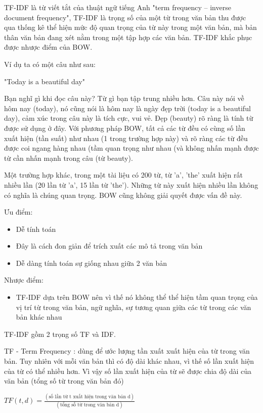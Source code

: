 TF-IDF là từ viết tắt của thuật ngữ tiếng Anh "term frequency – inverse document frequency", TF-IDF là trọng số của một từ trong văn bản thu được qua thống kê thể hiện mức độ quan trọng của từ này trong một văn bản, mà bản thân văn bản đang xét nằm trong một tập hợp các văn bản. TF-IDF khắc phục được nhược điểm của BOW.

Ví dụ ta có một câu như sau:

"Today is a beautiful day"
  
Bạn nghĩ gì khi đọc câu này? Từ gì bạn tập trung nhiều hơn. Câu này nói về hôm nay (today), nó cũng nói là hôm nay là ngày đẹp trời (today is a beautiful day), cảm xúc trong câu này là tích cực, vui vẻ. Đẹp (beauty) rõ ràng là tính từ được sử dụng ở đây. Với phương pháp BOW, tất cả các từ đều có cùng số lần xuất hiện (tần suất) như nhau (1 trong trường hợp này) và rõ ràng các từ đều được coi ngang hàng nhau (tầm quan trọng như nhau (và không nhấn mạnh được từ cần nhấn mạnh trong câu (từ beauty).

Một trường hợp khác, trong một tài liệu có 200 từ, từ 'a', 'the' xuất hiện rất nhiều lần (20 lần từ 'a', 15 lần từ 'the'). Những từ này xuất hiện nhiều lần không có nghĩa là chúng quan trọng. BOW cũng không giải quyết được vấn đề này.

Ưu điểm:
\begin{itemize}
    \item Dễ tính toán
    \item Đây là cách đon giản để trích xuất các mô tả trong văn bản
    \item Dễ dàng tính toán sự giống nhau giữa 2 văn bản
\end{itemize}

Nhược điểm:
\begin{itemize}
    \item TF-IDF dựa trên BOW nên vì thế nó không thể thể hiện tầm quan trọng của vị trí từ trong văn bản, ngữ nghĩa, sự tương quan giữa các từ trong các văn bản khác nhau
\end{itemize}

TF-IDF gồm 2 trọng số TF và IDF.

TF - Term Frequency : dùng để ước lượng tần xuất xuất hiện của từ trong văn bản. Tuy nhiên với mỗi văn bản thì có độ dài khác nhau, vì thế số lần xuất hiện của từ có thể nhiều hơn. Vì vậy số lần xuất hiện của từ sẽ được chia độ dài của văn bản (tổng số từ trong văn bản đó)

\begin{center}
    $TF(t, d) =  \frac{( \text{số lần từ t xuất hiện trong văn bản d})}{ (\text{tổng số từ trong văn bản d})}$
\end{center}

